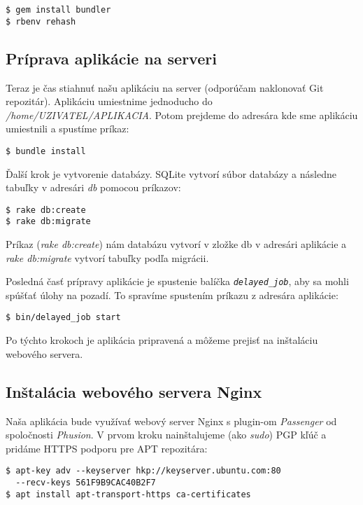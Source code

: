 \begin{verbatim}
$ gem install bundler
$ rbenv rehash
\end{verbatim}

\clearpage
\subsection*{Príprava aplikácie na serveri}

Teraz je čas stiahnuť našu aplikáciu na server (odporúčam naklonovať Git repozitár). Aplikáciu umiestnime jednoducho do \emph{/home/UZIVATEL/APLIKACIA}. Potom prejdeme do adresára kde sme aplikáciu umiestnili a spustíme príkaz:

\begin{verbatim}
$ bundle install
\end{verbatim}

Ďalší krok je vytvorenie databázy. SQLite vytvorí súbor databázy a následne tabuľky v adresári \emph{db} pomocou príkazov:

\begin{verbatim}
$ rake db:create
$ rake db:migrate
\end{verbatim}

Príkaz (\emph{rake db:create}) nám databázu vytvorí v zložke db v adresári aplikácie a \emph{rake db:migrate} vytvorí tabuľky podľa migrácii.

Posledná časť prípravy aplikácie je spustenie balíčka \emph{\texttt{delayed\_job}}, aby sa mohli spúšťať úlohy na pozadí. To spravíme spustením príkazu z adresára aplikácie:

\begin{verbatim}
$ bin/delayed_job start
\end{verbatim}

Po týchto krokoch je aplikácia pripravená a môžeme prejisť na inštaláciu webového servera.

\subsection*{Inštalácia webového servera Nginx}

Naša aplikácia bude využívať webový server Nginx s plugin-om \emph{Passenger} od spoločnosti \emph{Phusion}. V prvom kroku nainštalujeme (ako \emph{sudo}) PGP kľúč a pridáme HTTPS podporu pre APT repozitára:

\begin{verbatim}
$ apt-key adv --keyserver hkp://keyserver.ubuntu.com:80 
  --recv-keys 561F9B9CAC40B2F7
$ apt install apt-transport-https ca-certificates
\end{verbatim}

